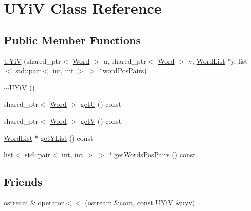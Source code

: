 \hypertarget{classUYiV}{\section{U\-Yi\-V Class Reference}
\label{classUYiV}
}
\subsection*{Public Member Functions}
\begin{DoxyCompactItemize}
\item 
\hyperlink{classUYiV_adf0e2a852f17f69c7b1869796000bdd6}{U\-Yi\-V} (shared\-\_\-ptr$<$ \hyperlink{classWord}{Word} $>$ u, shared\-\_\-ptr$<$ \hyperlink{classWord}{Word} $>$ v, \hyperlink{classWordList}{Word\-List} $\ast$y, list$<$ std\-::pair$<$ int, int $>$ $>$ $\ast$word\-Pos\-Pairs)
\item 
\hyperlink{classUYiV_a9b4ae3160a5dd8958dcdfbec15e1c10d}{$\sim$\-U\-Yi\-V} ()
\item 
shared\-\_\-ptr$<$ \hyperlink{classWord}{Word} $>$ \hyperlink{classUYiV_a80b95efe10986175a647b542fb895f2c}{get\-U} () const 
\item 
shared\-\_\-ptr$<$ \hyperlink{classWord}{Word} $>$ \hyperlink{classUYiV_a300567ec5b8f64bbf7068d27e8c5d5a5}{get\-V} () const 
\item 
\hyperlink{classWordList}{Word\-List} $\ast$ \hyperlink{classUYiV_addbe66c8b6a903e5288857f804db7c42}{get\-Y\-List} () const 
\item 
list$<$ std\-::pair$<$ int, int $>$ $>$ $\ast$ \hyperlink{classUYiV_a47434f44a12ac72d7f88215138267b41}{get\-Words\-Pos\-Pairs} () const 
\end{DoxyCompactItemize}
\subsection*{Friends}
\begin{DoxyCompactItemize}
\item 
ostream \& \hyperlink{classUYiV_ad43a43bd82da7f47415a9c80feaa2370}{operator$<$$<$} (ostream \&cout, const \hyperlink{classUYiV}{U\-Yi\-V} \&uyv)
\end{DoxyCompactItemize}



